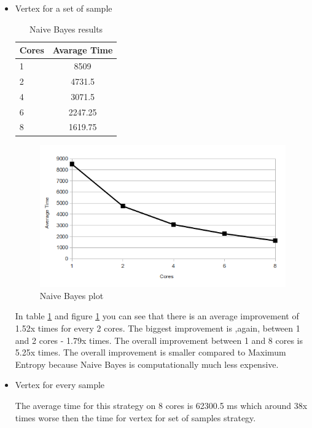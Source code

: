 \documentclass{report}
\begin{document}
\begin{itemize}

\item{Vertex for a set of sample}

\begin{table}[ht]
\centering
\begin{tabular}{ l c }
    \hline\hline
    Cores & Avarage Time \\ [0.2ex]
    \hline
    1 & 8509 \\
    2 & 4731.5  \\
    4 & 3071.5  \\
    6 & 2247.25  \\
    8 & 1619.75  \\
    \hline
  \end{tabular}
\label{table:naiveres1}
\caption{Naive Bayes results}
\end{table}

\begin{figure}[!htb]
  \centering
  \includegraphics*[scale=0.70]{naivebayes_plot.png}
  \caption{Naive Bayes plot}
  \label{fig:naive_plot}
\end{figure}

In table \ref{table:naiveres1} and figure \ref{fig:naive_plot} you can see that there is an average improvement of 1.52x times for every 2 cores. The biggest improvement is ,again, between 1 and 2 cores - 1.79x times. The overall improvement between 1 and 8 cores is 5.25x times. The overall improvement is smaller compared to Maximum Entropy because Naive Bayes is computationally much less expensive.

\item{Vertex for every sample}

The average time for this strategy on 8 cores is 62300.5 ms which around 38x times worse then the time for vertex for set of samples strategy.


\end{itemize}
\end{document}
